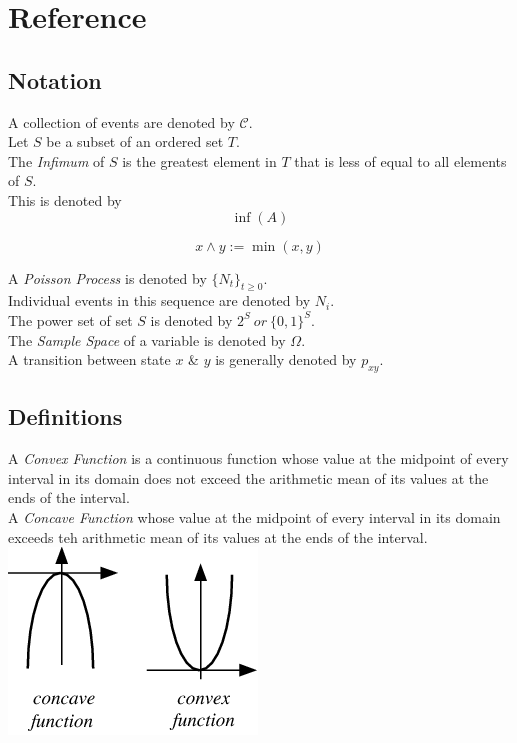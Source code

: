 \documentclass[11pt,a4paper]{article}
\begin{document}
\newpage
\setcounter{section}{-1}
\section{Reference}

\subsection{Notation}

A collection of events are denoted by $\mathcal{C}$.\\

Let $S$ be a subset of an ordered set $T$.\\
The \textit{Infimum} of $S$ is the greatest element in $T$ that is less of equal to all elements of $S$.\\
This is denoted by
$$\inf(A)$$

$$x\wedge y:=\min(x,y)$$

A \textit{Poisson Process} is denoted by $\{N_t\}_{t\geq 0}$.\\
Individual events in this sequence are denoted by $N_i$.\\

The power set of set $S$ is denoted by $2^S\ or\ \{0,1\}^S$.\\

The \textit{Sample Space} of a variable is denoted by $\Omega$.\\

A transition between state $x$ \& $y$ is generally denoted by $p_{xy}$.\\

\subsection{Definitions}

A \textit{Convex Function} is a continuous function whose value at the midpoint of every interval in its domain does not exceed the arithmetic mean of its values at the ends of the interval.\\
A \textit{Concave Function} whose value at the midpoint of every interval in its domain exceeds teh arithmetic mean of its values at the ends of the interval.\\
\includegraphics[scale=0.5]{img/convexConcave.png}
\end{document}
